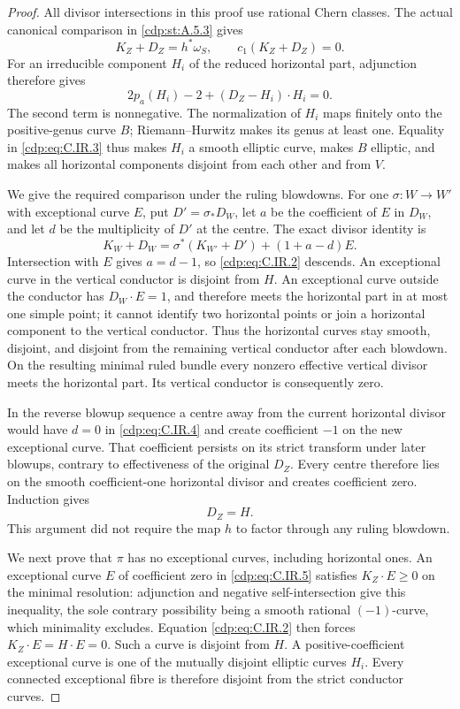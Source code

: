 \begin{proof}
All divisor intersections in this proof use rational Chern
classes. The actual canonical comparison in \ref{cdp:st:A.5.3} gives
\[
 K_Z+D_Z=h^*\omega_S,\qquad c_1(K_Z+D_Z)=0.
                                                     \tag{C.IR.2}\label{cdp:eq:C.IR.2}
\]
For an irreducible component $H_i$ of the reduced horizontal
part, adjunction therefore gives
\[
 2p_a(H_i)-2+(D_Z-H_i)\cdot H_i=0.                 \tag{C.IR.3}\label{cdp:eq:C.IR.3}
\]
The second term is nonnegative. The normalization of $H_i$
maps finitely onto the positive-genus curve $B$; Riemann--Hurwitz
makes its genus at least one. Equality in \eqref{cdp:eq:C.IR.3} thus makes
$H_i$ a smooth elliptic curve, makes $B$ elliptic, and makes
all horizontal components disjoint from each other and from
$V$.

We give the required comparison under the ruling blowdowns.
For one $\sigma:W\to W'$ with exceptional curve $E$, put
$D'=\sigma_*D_W$, let $a$ be the coefficient of $E$ in $D_W$,
and let $d$ be the multiplicity of $D'$ at the centre. The
exact divisor identity is
\[
 K_W+D_W=\sigma^*(K_{W'}+D')+(1+a-d)E.
                                                     \tag{C.IR.4}\label{cdp:eq:C.IR.4}
\]
Intersection with $E$ gives $a=d-1$, so \eqref{cdp:eq:C.IR.2} descends.
An exceptional curve in the vertical conductor is disjoint
from $H$. An exceptional curve outside the conductor has
$D_W\cdot E=1$, and therefore meets the horizontal part in
at most one simple point; it cannot identify two horizontal
points or join a horizontal component to the vertical
conductor. Thus the horizontal curves stay smooth, disjoint,
and disjoint from the remaining vertical conductor after
each blowdown. On the resulting minimal ruled bundle every
nonzero effective vertical divisor meets the horizontal
part. Its vertical conductor is consequently zero.

In the reverse blowup sequence a centre away from the current
horizontal divisor would have $d=0$ in \eqref{cdp:eq:C.IR.4} and create
coefficient $-1$ on the new exceptional curve. That coefficient
persists on its strict transform under later blowups, contrary
to effectiveness of the original $D_Z$. Every centre
therefore lies on the smooth coefficient-one horizontal
divisor and creates coefficient zero. Induction gives
\[
                             D_Z=H.               \tag{C.IR.5}\label{cdp:eq:C.IR.5}
\]
This argument did not require the map $h$ to factor through
any ruling blowdown.

We next prove that $\pi$ has no exceptional curves, including
horizontal ones. An exceptional curve $E$ of coefficient
zero in \eqref{cdp:eq:C.IR.5} satisfies $K_Z\cdot E\ge0$ on the minimal
resolution: adjunction and negative self-intersection give
this inequality, the sole contrary possibility being a
smooth rational $(-1)$-curve, which minimality excludes.
Equation \eqref{cdp:eq:C.IR.2} then forces $K_Z\cdot E=H\cdot E=0$.
Such a curve is disjoint from $H$. A positive-coefficient
exceptional curve is one of the mutually disjoint elliptic
curves $H_i$. Every connected exceptional fibre is therefore
disjoint from the strict conductor curves.


\end{proof}
